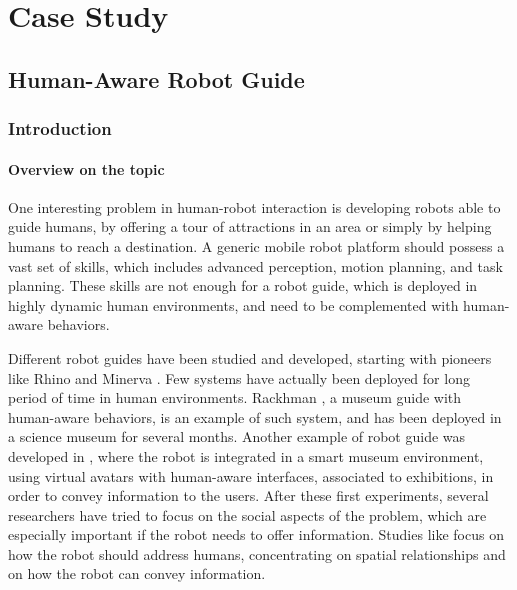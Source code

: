 
\chapter{Case Study} %

\label{chapter:case_study} %



\section{Human-Aware Robot Guide}
\subsection{Introduction}
\subsubsection{Overview on the topic}
One interesting problem in human-robot interaction is developing robots able to guide humans, by offering a tour of attractions in an area or simply by helping humans to reach a destination.
A generic mobile robot platform should possess a vast set of skills, which includes advanced perception, motion planning, and task planning. These skills are not enough for a robot guide, which is deployed in highly dynamic human environments, and need to be complemented with human-aware behaviors.

Different robot guides have been studied and developed, starting with pioneers like Rhino and Minerva \cite{thrun2000probabilistic}.  Few systems have actually been deployed for long period of time in human environments. Rackhman \cite{clodic2006rackham}, a museum guide with human-aware behaviors, is an example of such system, and has been deployed in a science museum for several months. Another example of robot guide was developed in \cite{bueno2011autonomous}, where the robot is integrated  in a smart museum environment, using virtual avatars with human-aware interfaces, associated to exhibitions, in order to convey information to the users. After these first experiments, several researchers have tried to focus on the social aspects of the problem, which are especially important if the robot needs to offer information. Studies like \cite{yousuf2012development,evers2014development} focus on how the robot should address humans, concentrating on spatial relationships and on how the robot can convey information.

